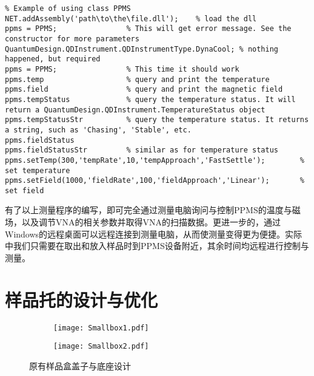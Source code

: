             \begin{lstlisting}
% Example of using class PPMS
NET.addAssembly('path\to\the\file.dll');	% load the dll
ppms = PPMS;				% This will get error message. See the constructor for more parameters
QuantumDesign.QDInstrument.QDInstrumentType.DynaCool; % nothing happened, but required
ppms = PPMS;				% This time it should work
ppms.temp					% query and print the temperature
ppms.field					% query and print the magnetic field
ppms.tempStatus				% query the temperature status. It will return a QuantumDesign.QDInstrument.TemperatureStatus object
ppms.tempStatusStr			% query the temperature status. It returns a string, such as 'Chasing', 'Stable', etc.
ppms.fieldStatus
ppms.fieldStatusStr			% similar as for temperature status
ppms.setTemp(300,'tempRate',10,'tempApproach','FastSettle');		% set temperature
ppms.setField(1000,'fieldRate',100,'fieldApproach','Linear');		% set field
            \end{lstlisting}

            有了以上测量程序的编写，即可完全通过测量电脑询问与控制PPMS的温度与磁场，以及调节VNA的相关参数并取得VNA的扫描数据。更进一步的，通过Windows的远程桌面可以远程连接到测量电脑，从而使测量变得更为便捷。实际中我们只需要在取出和放入样品时到PPMS设备附近，其余时间均远程进行控制与测量。


            \section{样品托的设计与优化} %
            \label{sec:样品托的设计与优化}



\begin{figure}[h]
  \centering%
  \begin{subfigure}{0.4\textwidth}
    \texttt{[image: Smallbox1.pdf]}
  \end{subfigure}%
  \hfill
  \begin{subfigure}{0.4\textwidth}
    \texttt{[image: Smallbox2.pdf]}
  \end{subfigure}
  \caption{原有样品盒盖子与底座设计}
  \label{fig:oldSampleBox}
\end{figure}
                  












